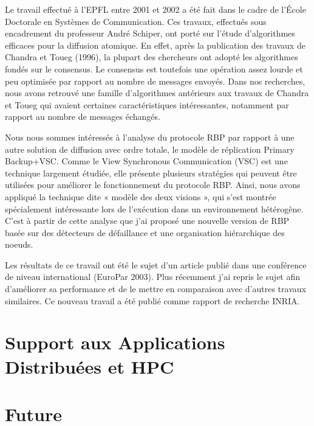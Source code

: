 \documentclass[a4paper]{book}
\begin{document}
Le travail effectué à l'EPFL entre 2001 et 2002 a été fait dans le cadre de l'École Doctorale en Systèmes de Communication. Ces travaux, effectués sous encadrement du professeur André Schiper, ont porté sur l'étude d'algorithmes efficaces pour la diffusion atomique. En effet, après la publication des travaux de Chandra et Toueg (1996), la plupart des chercheurs ont adopté les algorithmes fondés sur le consensus. Le consensus est toutefois une opération assez lourde et peu optimisée par rapport au nombre de messages envoyés. Dans nos recherches, nous avons retrouvé une famille d'algorithmes antérieurs aux travaux de Chandra et Toueg qui avaient certaines caractéristiques intéressantes, notamment par rapport au nombre de messages échangés.

Nous nous sommes intéressés à l'analyse du protocole RBP par rapport à une autre solution de diffusion avec ordre totale, le modèle de réplication Primary Backup+VSC. Comme le View Synchronous Communication (VSC) est une technique largement étudiée, elle présente plusieurs stratégies qui peuvent être utilisées pour améliorer le fonctionnement du protocole RBP. Ainsi, nous avons appliqué la technique dite « modèle des deux visions », qui s'est montrée spécialement intéressante lors de l'exécution dans un environnement hétérogène. C'est à partir de cette analyse que j'ai proposé une nouvelle version de RBP basée sur des détecteurs de défaillance et une organisation hiérarchique des noeuds.

Les résultats de ce travail ont été le sujet d'un article publié dans une conférence de niveau international (EuroPar 2003). Plus récemment j'ai repris le sujet afin d'améliorer sa performance et de le mettre en comparaison avec d'autres travaux similaires. Ce nouveau travail a été publié comme rapport de recherche INRIA.





\section{Support aux Applications Distribuées et HPC}


\section{Future}



\end{document}
